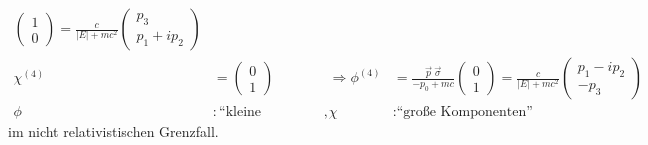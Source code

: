 \begin{enumerate}[1.]
\begin{align*}
			\begin{pmatrix}
			1 \\ 0
			\end{pmatrix}
			= \frac{c}{|E| + mc^2}
			\begin{pmatrix}
			p_3 \\ p_1 + ip_2
			\end{pmatrix} 
			\\
			\chi^{(4)} &= 
			\begin{pmatrix}
			0 \\ 1
			\end{pmatrix}
			&\Rightarrow 
			\phi^{(4)} &= \frac{\vec{p}~\vec{\sigma}}{-p_0 + mc}
			\begin{pmatrix}
			0 \\ 1
			\end{pmatrix}
			= \frac{c}{|E| + mc^2}
			\begin{pmatrix}
			p_1 - ip_2 \\ -p_3
			\end{pmatrix}
			\\
			\phi &: \text{``kleine Komponenten''} ,& \chi &: \text{``große Komponenten''}
		\end{align*}
	im nicht relativistischen Grenzfall.
	\end{enumerate}
